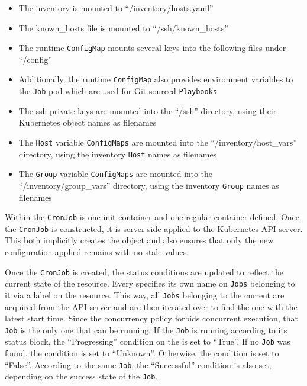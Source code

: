 \begin{itemize}
	\item{The inventory is mounted to \enquote{/inventory/hosts.yaml}}
	\item{The known\_hosts file is mounted to \enquote{/ssh/known\_hosts}}
	\item{The runtime \texttt{ConfigMap} mounts several keys into the following files under \enquote{/config}}
	\item{Additionally, the runtime \texttt{ConfigMap} also provides environment variables to the \texttt{Job} \gls{pod} which are used for Git-sourced \texttt{Playbooks}}
	\item{The \gls{ssh} private keys are mounted into the \enquote{/ssh} directory, using their Kubernetes object names as filenames}
	\item{The \texttt{Host} variable \texttt{ConfigMaps} are mounted into the \enquote{/inventory/host\_vars} directory, using the inventory \texttt{Host} names as filenames}
	\item{The \texttt{Group} variable \texttt{ConfigMaps} are mounted into the \enquote{/inventory/group\_vars} directory, using the inventory \texttt{Group} names as filenames}
\end{itemize}

Within the \texttt{CronJob} is one init container and one regular container defined.
Once the \texttt{CronJob} is constructed, it is server-side applied to the Kubernetes API server.
This both implicitly creates the object and also ensures that only the new configuration applied remains with no stale values.

Once the \texttt{CronJob} is created, the status conditions are updated to reflect the current state of the resource.
Every \anrecjob specifies its own name on \texttt{Jobs} belonging to it via a label on the resource.
This way, all \texttt{Jobs} belonging to the current \anrecjob are acquired from the API server and are then iterated over to find the one with the latest start time. Since the concurrency policy forbids concurrent execution, that \texttt{Job} is the only one that can be running.
If the \texttt{Job} is running according to its status block, the \enquote{Progressing} condition on the \anrecjob is set to \enquote{True}.
If no \texttt{Job} was found, the condition is set to \enquote{Unknown}.
Otherwise, the condition is set to \enquote{False}.
According to the same \texttt{Job}, the \enquote{Successful} condition is also set, depending on the success state of the \texttt{Job}.

